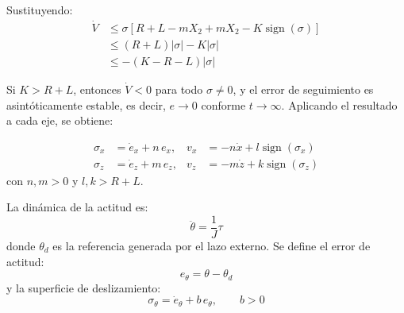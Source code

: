 \begin{enumerate}
\begin{itemize}
        Sustituyendo:
        \begin{equation*}
            \begin{aligned}
                \dot{V} &\le \sigma\left[R+L-mX_2+mX_2-K\operatorname{sign}(\sigma)\right] \\
                &\le (R+L)|\sigma|-K|\sigma| \\
                &\le -(K-R-L)|\sigma|
            \end{aligned}
        \end{equation*}

        Si $K>R+L$, entonces $\dot{V}<0$ para todo $\sigma\neq 0$, y el error de seguimiento es asintóticamente estable, es decir, $e\to 0$ conforme $t\to\infty$. Aplicando el resultado a cada eje, se obtiene:

        \begin{equation*}
            \begin{aligned}
                \sigma_x &= \dot{e}_x+n\,e_x, & v_x &= -n\dot{x}+l\operatorname{sign}(\sigma_x) \\
                \sigma_z &= \dot{e}_z+m\,e_z, & v_z &= -m\dot{z}+k\operatorname{sign}(\sigma_z)
            \end{aligned}
        \end{equation*}
        con $n,m>0$ y $l,k>R+L$.

        La dinámica de la actitud es:
        \begin{equation*}
            \ddot{\theta}=\frac{1}{J}\tau
        \end{equation*}
        donde $\theta_d$ es la referencia generada por el lazo externo. Se define el error de actitud:
        \begin{equation*}
            e_\theta = \theta-\theta_d
        \end{equation*}
        y la superficie de deslizamiento:
        \begin{equation*}
            \sigma_\theta = \dot{e}_\theta + b\,e_\theta,\qquad b>0
        \end{equation*}


\end{itemize}
\end{enumerate}
